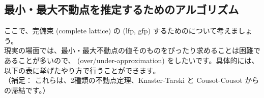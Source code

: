 \documentclass[
		head_space=20mm,
		foot_space=20mm,
		gutter=10mm,
		line_length=190mm
]{jlreq}
\begin{document}






\clearpage

\subsection{最小・最大不動点を推定するためのアルゴリズム}

\noindent ここで、完備束 (complete lattice) の (lfp, gfp) するためのについて考えましょう。\\ 現実の場面では、最小・最大不動点の値そのものをぴったり求めることは困難であることが多いので、 (over/under-approximation) をしたいです。具体的には、以下の表に挙げたやり方で行うことができます。\\%
（補足： これらは、2種類の不動点定理、Knaster-Tarski と Cousot-Cousot からの帰結です。）\vspace{15pt}
\end{document}
